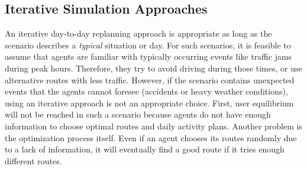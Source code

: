 \subsection{Iterative Simulation Approaches} 
\label{sec:IterativeSimulationApproaches}

An iterative day-to-day replanning approach is appropriate as long as the scenario describes a \emph{typical} situation or day. For such scenarios, it is feasible to assume that agents are familiar with typically occurring events like traffic jams during peak hours. Therefore, they try to avoid driving during those times, or use alternative routes with less traffic. However, if the scenario contains unexpected events that the agents cannot foresee (\eg accidents or heavy weather conditions), using an iterative approach is not an appropriate choice. First, user equilibrium will not be reached in such a scenario because agents do not have enough information to choose optimal routes and daily activity plans. Another problem is the optimization process itself. Even if an agent chooses its routes randomly due to a lack of information, it will eventually find a good route if it tries enough different routes.

